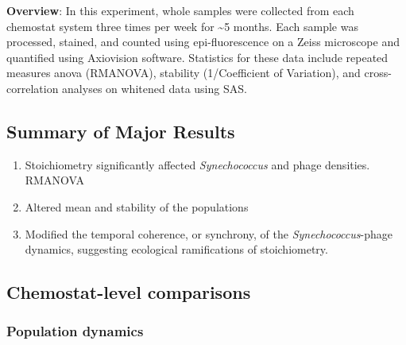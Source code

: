 \documentclass[]{article}
\providecommand{\tightlist}{%
  \setlength{\itemsep}{0pt}\setlength{\parskip}{0pt}}
\begin{document}
\textbf{Overview}: In this experiment, whole samples were collected from
each chemostat system three times per week for \textasciitilde{}5
months. Each sample was processed, stained, and counted using
epi-fluorescence on a Zeiss microscope and quantified using Axiovision
software. Statistics for these data include repeated measures anova
(RMANOVA), stability (1/Coefficient of Variation), and cross-correlation
analyses on whitened data using SAS.

\subsection{Summary of Major Results}\label{summary-of-major-results-1}

\begin{enumerate}
\def\labelenumi{\arabic{enumi}.}
\tightlist
\item
  Stoichiometry significantly affected \emph{Synechococcus} and phage
  densities. RMANOVA
\item
  Altered mean and stability of the populations
\item
  Modified the temporal coherence, or synchrony, of the
  \emph{Synechococcus}-phage dynamics, suggesting ecological
  ramifications of stoichiometry.
\end{enumerate}

\newpage

\subsection{Chemostat-level
comparisons}\label{chemostat-level-comparisons}

\subsubsection{Population dynamics}\label{population-dynamics}
\end{document}
